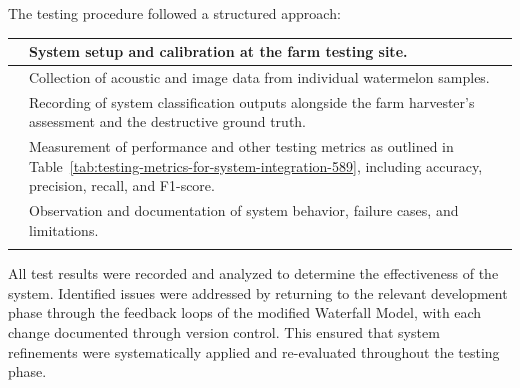 \begin{thesisprose}
The testing procedure followed a structured approach:

\FloatBarrier
\begingroup
\small
\setlength{\tabcolsep}{3pt}
\renewcommand{\arraystretch}{1.14}
\setlength{\arrayrulewidth}{1pt}
\def\LTcaptype{uncaptionedgrid}
\begin{longtable}{!{\textcolor[HTML]{F3F3F3}{\vrule width 1pt}}>{\raggedright\arraybackslash}p{\tabcolsep-2pt\relax}!{\textcolor[HTML]{F3F3F3}{\vrule width 1pt}}>{\raggedright\arraybackslash}p{\tabcolsep-1pt\relax}!{\textcolor[HTML]{F3F3F3}{\vrule width 1pt}}}
 & System setup and calibration at the farm testing site. \\
 & Collection of acoustic and image data from individual watermelon samples. \\
 & Recording of system classification outputs alongside the farm harvester's assessment and the destructive ground truth. \\
 & Measurement of performance and other testing metrics as outlined in Table~\ref{tab:testing-metrics-for-system-integration-589}, including accuracy, precision, recall, and F1-score. \\
 & Observation and documentation of system behavior, failure cases, and limitations. \\
\end{longtable}
\endgroup

All test results were recorded and analyzed to determine the effectiveness of the system. Identified issues were addressed by returning to the relevant development phase through the feedback loops of the modified Waterfall Model, with each change documented through version control. This ensured that system refinements were systematically applied and re-evaluated throughout the testing phase.


\end{thesisprose}
